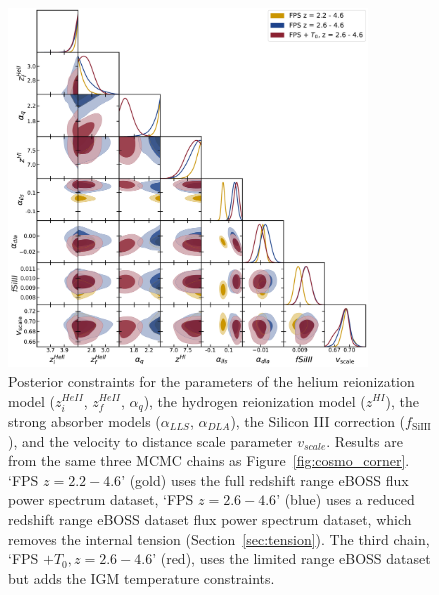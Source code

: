 \begin{figure}
    \centering
    \includegraphics[width=0.85\textwidth]{figures/astro_corner.pdf}
    \caption{\label{fig:astro_corner}
    Posterior constraints for the parameters of the helium reionization model ($z_i^{HeII}$, $z_f^{HeII}$, $\alpha_q$), the hydrogen reionization model ($z^{HI}$), the strong absorber models ($\alpha_{LLS}$, $\alpha_{DLA}$), the Silicon III correction ($f_\mathrm{SiIII}$), and the velocity to distance scale parameter $v_{scale}$.
    Results are from the same three MCMC chains as Figure~\ref{fig:cosmo_corner}. `FPS $z=2.2-4.6$' (gold) uses the full redshift range eBOSS flux power spectrum dataset, `FPS $z=2.6-4.6$' (blue) uses a reduced redshift range eBOSS dataset flux power spectrum dataset, which removes the internal tension (Section~\ref{sec:tension}). The third chain, `FPS $+ T_0, z=2.6-4.6$' (red), uses the limited range eBOSS dataset but adds the IGM temperature constraints.
    }
\end{figure}

